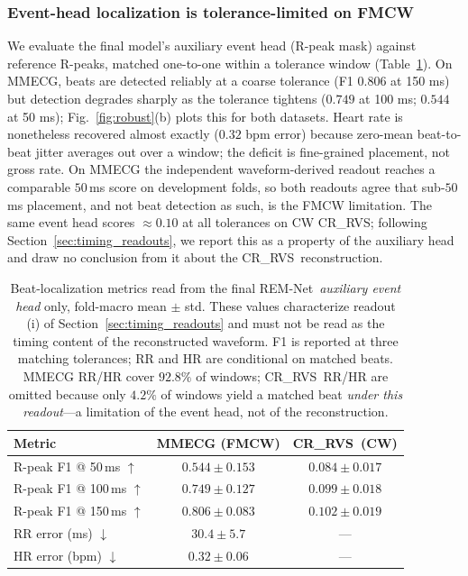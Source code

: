 \documentclass[lettersize,journal]{IEEEtran}
\newcommand{\remnet}{REM-Net\xspace}
\newcommand{\crrvs}{CR\_RVS\xspace}
\begin{document}
\subsubsection{Event-head localization is tolerance-limited on FMCW}
We evaluate the final model's auxiliary event head (R-peak mask) against reference R-peaks, matched one-to-one within a tolerance window (Table~\ref{tab:rate}). On MMECG, beats are detected reliably at a coarse tolerance (F1 $0.806$ at 150 ms) but detection degrades sharply as the tolerance tightens ($0.749$ at 100 ms; $0.544$ at 50 ms); Fig.~\ref{fig:robust}(b) plots this for both datasets. Heart rate is nonetheless recovered almost exactly ($0.32$ bpm error) because zero-mean beat-to-beat jitter averages out over a window; the deficit is fine-grained placement, not gross rate. On MMECG the independent waveform-derived readout reaches a comparable $50$\,ms score on development folds, so both readouts agree that sub-$50$\,ms placement, and not beat detection as such, is the FMCW limitation. The same event head scores $\approx 0.10$ at all tolerances on CW \crrvs; following Section~\ref{sec:timing_readouts}, we report this as a property of the auxiliary head and draw no conclusion from it about the \crrvs\ reconstruction.

\begin{table}[!t]
\centering
\caption{Beat-localization metrics read from the final \remnet\ \emph{auxiliary event head} only, fold-macro mean $\pm$ std. These values characterize readout (i) of Section~\ref{sec:timing_readouts} and must not be read as the timing content of the reconstructed waveform. F1 is reported at three matching tolerances; RR and HR are conditional on matched beats. MMECG RR/HR cover $92.8\%$ of windows; \crrvs\ RR/HR are omitted because only $4.2\%$ of windows yield a matched beat \emph{under this readout}---a limitation of the event head, not of the reconstruction.}
\label{tab:rate}
\begin{tabular}{lcc}
\toprule
Metric & MMECG (FMCW) & \crrvs\ (CW) \\
\midrule
R-peak F1 @ 50\,ms $\uparrow$  & $0.544 \pm 0.153$ & $0.084 \pm 0.017$ \\
R-peak F1 @ 100\,ms $\uparrow$ & $0.749 \pm 0.127$ & $0.099 \pm 0.018$ \\
R-peak F1 @ 150\,ms $\uparrow$ & $0.806 \pm 0.083$ & $0.102 \pm 0.019$ \\
RR error (ms) $\downarrow$     & $30.4 \pm 5.7$    & --- \\
HR error (bpm) $\downarrow$    & $0.32 \pm 0.06$   & --- \\
\bottomrule
\end{tabular}
\end{table}
\end{document}
